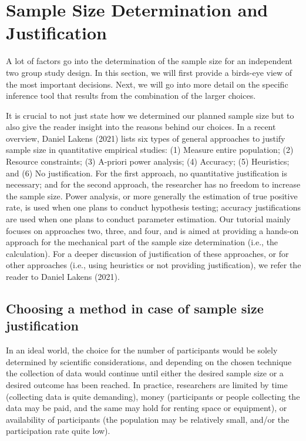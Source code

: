 \documentclass[
  english,
  man,floatsintext]{apa6}
\begin{document}
\hypertarget{sample-size-determination-and-justification}{%
\section{Sample Size Determination and Justification}\label{sample-size-determination-and-justification}}

A lot of factors go into the determination of the sample size for an independent two group study design. In this section, we will first provide a birds-eye view of the most important decisions. Next, we will go into more detail on the specific inference tool that results from the combination of the larger choices.

It is crucial to not just state how we determined our planned sample size but to also give the reader insight into the reasons behind our choices. In a recent overview, Daniel Lakens (2021) lists six types of general approaches to justify sample size in quantitative empirical studies: (1) Measure entire population; (2) Resource constraints; (3) A-priori power analysis; (4) Accuracy; (5) Heuristics; and (6) No justification. For the first approach, no quantitative justification is necessary; and for the second approach, the researcher has no freedom to increase the sample size. Power analysis, or more generally the estimation of true positive rate, is used when one plans to conduct hypothesis testing; accuracy justifications are used when one plans to conduct parameter estimation. Our tutorial mainly focuses on approaches two, three, and four, and is aimed at providing a hands-on approach for the mechanical part of the sample size determination (i.e., the calculation). For a deeper discussion of justification of these approaches, or for other approaches (i.e., using heuristics or not providing justification), we refer the reader to Daniel Lakens (2021).

\hypertarget{choosing-a-method-in-case-of-sample-size-justification}{%
\subsection{Choosing a method in case of sample size justification}\label{choosing-a-method-in-case-of-sample-size-justification}}

In an ideal world, the choice for the number of participants would be solely determined by scientific considerations, and depending on the chosen technique the collection of data would continue until either the desired sample size or a desired outcome has been reached. In practice, researchers are limited by time (collecting data is quite demanding), money (participants or people collecting the data may be paid, and the same may hold for renting space or equipment), or availability of participants (the population may be relatively small, and/or the participation rate quite low).
\end{document}
